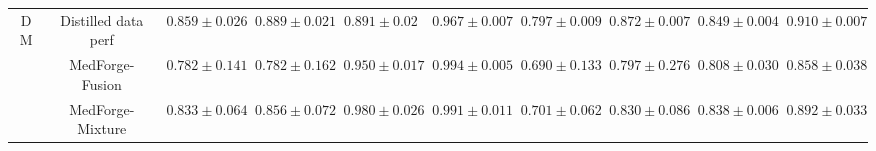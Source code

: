 \begin{table*}[ht]
{\begin{tabular}{c|c|cc|cc|cc|cc}
\multirow{3}{*}{DM} & Distilled data perf & \multicolumn{1}{c|}{$0.859 \pm 0.026$} & {$0.889 \pm 0.021$} & \multicolumn{1}{c|}{$0.891 \pm 0.02$} & {$0.967 \pm 0.007$} & \multicolumn{1}{c|}{$0.797 \pm 0.009$} & {$0.872 \pm 0.007$} & \multicolumn{1}{c|}{$0.849 \pm 0.004$} & {$0.910 \pm 0.007$} \\
& {MedForge-Fusion} & \multicolumn{1}{c|}{$0.782 \pm 0.141$} & {$0.782 \pm 0.162$}& \multicolumn{1}{c|}{$0.950 \pm 0.017$} & {$0.994 \pm 0.005$} & \multicolumn{1}{c|}{$0.690 \pm 0.133$} & {$0.797 \pm 0.276$} & \multicolumn{1}{c|}{\textbf{$0.808 \pm 0.030$}} & \textbf{$0.858 \pm 0.038$} \\
 & {MedForge-Mixture} & \multicolumn{1}{c|}{$0.833 \pm 0.064$} & {$0.856 \pm 0.072$}& \multicolumn{1}{c|}{$0.980 \pm 0.026$} & {$0.991 \pm 0.011$} & \multicolumn{1}{c|}{$0.701 \pm 0.062$} & {$0.830 \pm 0.086$} & \multicolumn{1}{c|}{$0.838 \pm 0.006$} & {$0.892 \pm 0.033$} \\
\bottomrule
\end{tabular}}
\end{table*}
